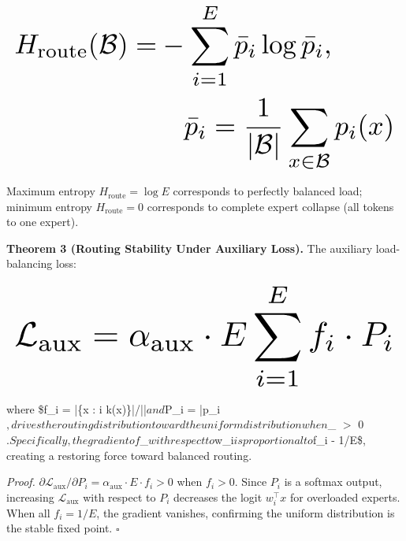 \documentclass{article}
\begin{document}
\begin{equation}
\resizebox{\columnwidth}{!}{$\displaystyle
\begin{aligned}
H_{\text{route}}(\mathcal{B}) = & -\sum_{i=1}^E \bar{p}_i \log \bar{p}_i, \\
& \quad \bar{p}_i = \frac{1}{|\mathcal{B}|}\sum_{x \in \mathcal{B}} p_i(x)
\end{aligned}
$}
\end{equation}















Maximum entropy $H_{\text{route}} = \log E$ corresponds to perfectly balanced load; minimum entropy $H_{\text{route}} = 0$ corresponds to complete expert collapse (all tokens to one expert).

\textbf{Theorem 3 (Routing Stability Under Auxiliary Loss).} The auxiliary load-balancing loss:















\begin{equation}
\resizebox{\columnwidth}{!}{$\displaystyle
\begin{aligned}
\mathcal{L}_{\text{aux}} = \alpha_{\text{aux}} \cdot E \sum_{i=1}^E f_i \cdot P_i
\end{aligned}
$}
\end{equation}















where \$f\_i = |\{x \in {} : i \in {}k(x)\}|/||$ and $P\_i = \bar{p}\_i$, drives the routing distribution toward the uniform distribution when $\alpha\_{} $>$ 0$. Specifically, the gradient of $\_{}$ with respect to $w\_i$ is proportional to $f\_i - 1/E\$, creating a restoring force toward balanced routing.

\textit{Proof.} $\partial \mathcal{L}_{\text{aux}}/\partial P_i = \alpha_{\text{aux}} \cdot E \cdot f_i > 0$ when $f_i > 0$. Since $P_i$ is a softmax output, increasing $\mathcal{L}_{\text{aux}}$ with respect to $P_i$ decreases the logit $w_i^\top x$ for overloaded experts. When all $f_i = 1/E$, the gradient vanishes, confirming the uniform distribution is the stable fixed point. $\square$
\end{document}
